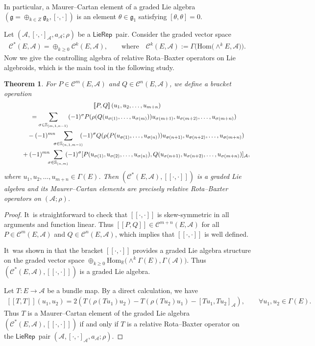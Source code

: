 \documentclass[pdftex]{sigma}%
\numberwithin{equation}{section}
\newtheorem{thm}{Theorem}[section]
\newcommand{\Real}{\mathbb R}
\newcommand{\huaA}{\mathcal{A}}
\newcommand{\huaC}{\mathcal{C}}
\newcommand{\frkg}{\mathfrak g}
\newcommand{\Courant}[1]{\left[\!\left[ #1\right]\!\right]}
\newcommand{\Hom}{\mathrm{Hom}}
\newcommand{\LP}{$\mathsf{LieRep}$~}
\begin{document}
In particular, a Maurer--Cartan element of a graded Lie algebra $(\frkg=\oplus_{k\in Z} \frkg_{k},[\cdot,\cdot])$ is an element $\theta\in \frkg_{1}$ satisfying $[\theta,\theta]=0$.

Let $(\huaA,[\cdot,\cdot]_\huaA,a_\huaA;\rho)$ be a \LP pair. Consider the graded vector space
\begin{gather*}
\huaC^*(E,\huaA)=\oplus_{k\geq0}\huaC^k(E,\huaA),\qquad
\text{where}\quad\huaC^k(E,\huaA):=\Gamma\big(\Hom\big({\wedge}^{k}E,\huaA\big)\big).
\end{gather*}
Now we give the controlling algebra of relative Rota--Baxter operators on Lie algebroids, which is the main tool in the following study.
\begin{thm}\label{thm:graded Lie algebra}
	For $P\in \huaC^m(E,\huaA)$ and $Q\in \huaC^n(E,\huaA)$, we define a bracket operation
\begin{gather}
\Courant{P,Q}(u_1,u_2,\dots,u_{m+n})\nonumber
\\ \qquad
{}=\sum_{\sigma\in\mathbb{S}_{(m,1,n-1)}} (-1)^\sigma P(\rho(Q(u_{\sigma(1)},\dots,u_{\sigma(m)}))
u_{\sigma(m+1)},u_{\sigma(m+2)},\dots,u_{\sigma(m+n)})\label{eq:graded Lie bracket}
\\ \qquad\hphantom{=}
{}-(-1)^{mn}\!\!\!\sum_{\sigma\in\mathbb{S}_{(n,1,m-1)}}\!\!\! (-1)^\sigma Q(\rho(P(u_{\sigma(1)},\dots,u_{\sigma(n)}))u_{\sigma(n+1)},u_{\sigma(n+2)},\dots,u_{\sigma(m+n)})\nonumber
\\ \qquad\hphantom{=}
{}+(-1)^{mn}\!\!\!\sum_{\sigma\in\mathbb{S}_{(n,m)}} \!\!\!(-1)^\sigma [P(u_{\sigma(1)}, u_{\sigma(2)},\dots,u_{\sigma(n)}),Q(u_{\sigma(n+1)},u_{\sigma(n+2)},\dots,u_{\sigma(m+n)})]_{\huaA},
\nonumber
\end{gather}
where $ u_1,u_2,\dots,u_{m+n} \in \Gamma(E)$.
Then $(\huaC^*(E,\huaA),\Courant{\cdot,\cdot})$ is a graded Lie algebra and its Maurer--Cartan elements are precisely relative Rota--Baxter operators on $(\huaA;\rho)$.
	\end{thm}
\begin{proof}
It~is straightforward to check that $\Courant{\cdot,\cdot}$ is skew-symmetric in all arguments and function linear. Thus $\Courant{P,Q}\in\huaC^{m+n}(E,\huaA)$ for all $P\in \huaC^m(E,\huaA)$ and $Q\in \huaC^n(E,\huaA)$, which implies that
$\Courant{\cdot,\cdot}$ is well defined.


It~was shown in \cite{TBGS} that the bracket $\Courant{\cdot,\cdot}$ provides a graded Lie algebra structure on the graded vector space $\oplus_{k\geq0}\Hom_\Real\big({\wedge}^{k}\Gamma(E),\Gamma(\huaA)\big)$. Thus $(\huaC^*(E,\huaA),\Courant{\cdot,\cdot})$ is a graded Lie algebra.

Let $T\colon E\rightarrow \huaA $ be a bundle map. By a direct calculation, we have
\begin{gather*}%
\Courant{T,T}(u_1,u_2)=2(T(\rho(Tu_1)u_2)-T(\rho(Tu_2)u_1)-[Tu_1,Tu_2]_{\huaA}),\qquad
\forall u_1, u_2\in \Gamma(E).
\end{gather*}
Thus $T$ is a Maurer--Cartan element of the graded Lie algebra $(\huaC^*(E,\huaA),\Courant{\cdot,\cdot})$ if and only if $T$ is a relative Rota--Baxter operator on the \LP pair $(\huaA,[\cdot,\cdot]_\huaA,a_\huaA;\rho)$.
\end{proof}
\end{document}
